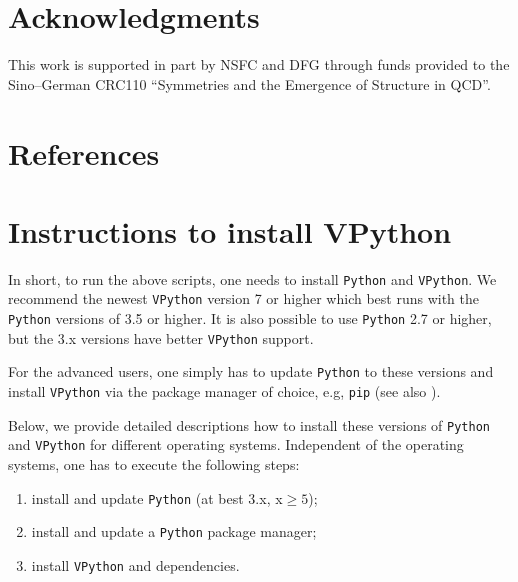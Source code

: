 \documentclass[12pt,ngerman,american]{iopart}
\newcommand{\python}[0]{\texttt{Python}}
\newcommand{\vpython}[0]{\texttt{VPython}}
\begin{document}
\section*{Acknowledgments}

This work is supported in part by NSFC and DFG through funds provided to the
Sino--German CRC110 ``Symmetries and the Emergence of Structure in QCD''.



\appendix
\section*{References}


\section{Instructions to install VPython}\label{appendix:python}
In short, to run the above scripts, one needs to install \python{} and \vpython{}.
We recommend the newest \vpython{} version 7 or higher which best runs with the \python{} versions of 3.5 or higher.
It is also possible to use \python{} 2.7 or higher, but the 3.x versions have better \vpython{} support.

For the advanced users, one simply has to update \python{} to these versions and install \vpython{} via the package manager of choice, e.g, \texttt{pip} (see also \cite{VPython}).

Below, we provide detailed descriptions how to install these versions of \python{} and \vpython{} for different operating systems.
Independent of the operating systems, one has to execute the following steps:
\begin{enumerate}
	\item install and update \python{} (at best 3.x, x$\geq5$);
	\item install and update a \python{} package manager;
	\item install \vpython{} and dependencies.
\end{enumerate}
\end{document}
